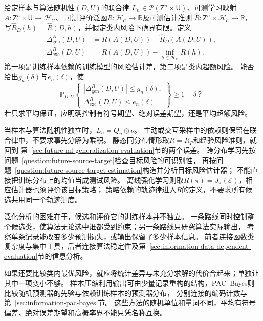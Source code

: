 \begin{mathproblem}[给定学习规则的泛化与超额风险]
  \label{question:future-learned-risk}
  给定样本与算法随机性$(D,U)$的联合律
  $L_n\in\mathcal P(\mathsf Z^n\times\mathsf U)$、可测学习映射
  $A:\mathsf Z^n\times\mathsf U\to\mathcal H_{\mathcal C}$、
  可测评价泛函$R:\mathcal H_{\mathcal C}\to\mathbb R$及可测估计准则
  $\widehat R:\mathsf Z^n\times\mathcal H_{\mathcal C}\to\mathbb R$，
  写$\widehat R_D(h)=\widehat R(D,h)$，并假定类内风险下确界有限。定义
  \[
    \begin{aligned}
      \Delta_{\mathrm{gen}}^R(D,U)
        &=R(A(D,U))-\widehat R_D(A(D,U)),\\
      \Delta_{\mathrm{exc}}^R(D,U)
        &=R(A(D,U))-\inf_{h\in\mathcal H_{\mathcal C}}R(h).
    \end{aligned}
  \]
  第一项是训练样本依赖的训练模型的风险估计差，第二项是类内超额风险。
  能否给出$g_n(\delta)$与$e_n(\delta)$，使
  \[
    \mathbb P_{D,U}\!\left\{
      \begin{gathered}
        |\Delta_{\mathrm{gen}}^R(D,U)|\leq g_n(\delta),\\
        \Delta_{\mathrm{exc}}^R(D,U)\leq e_n(\delta)
      \end{gathered}
    \right\}\geq1-\delta\text{？}
  \]
  若只求平均保证，应明确控制有符号期望、绝对误差期望，还是平均超额风险。
\end{mathproblem}

当样本与算法随机性独立时，$L_n=Q_n\otimes\nu$。
主动或交互采样中的依赖则保留在联合律中，不要求事先分解为乘积。
静态同分布情形取$R=R_P$和经验风险准则，就回到
第~\ref{sec:future-ml-generalization-evaluation}节的两个误差。
跨分布学习先按问题~\ref{question:future-source-target}检查目标风险的可识别性，
再按问题~\ref{question:future-source-target-estimation}构造并分析目标风险估计器；
不能直接把训练分布上的均值当成测试风险。
离线强化学习则取$R(\pi)=J_\pi(\mathcal E)$，相应估计器也须评价该目标策略；
策略依赖的轨迹律进入$R$的定义，不要求所有候选共用同一个轨迹测度。

泛化分析的困难在于，候选和评价它的训练样本并不独立。
一条路线同时控制整个候选类，使算法无论选中谁都受到约束；另一条路线只研究算法实际输出，
考察单条记录能改变多少预测损失，或输出保留了多少样本信息。
前者连接函数类复杂度与集中工具，后者连接算法稳定性及第~\ref{sec:information-data-dependent-evaluation}节的信息分析。

如果还要比较类内最优风险，就应将统计差异与未充分求解的代价合起来；单独让其中一项变小不够。
样本压缩利用输出可由少量记录重构的结构，PAC--Bayes则比较随机预测器的先验与依赖训练样本的预测器分布，
分别连接的编码计数与第~\ref{sec:information-pac-bayes}节。
这些方法的随机单位和量词不同，平均有符号偏差、绝对误差期望和高概率界不能只凭名称互换。

